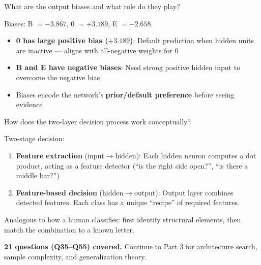 \documentclass[11pt,a4paper]{article}
\newcounter{qcounter}
\newcommand{\vq}[1]{\stepcounter{qcounter}\begin{tcolorbox}[qbox, title=Q\theqcounter]#1\end{tcolorbox}}
\newcommand{\va}[1]{\begin{tcolorbox}[abox, title=Answer]#1\end{tcolorbox}\vspace{6pt}}
\begin{document}
\vq{What are the output biases and what role do they play?}
\va{Biases: B $= -3.867$, 0 $= +3.189$, E $= -2.658$.
\begin{itemize}[nosep]
    \item \textbf{0 has large positive bias ($+3.189$)}: Default prediction when hidden units are inactive — aligns with all-negative weights for 0
    \item \textbf{B and E have negative biases}: Need strong positive hidden input to overcome the negative bias
    \item Biases encode the network's \textbf{prior/default preference} before seeing evidence
\end{itemize}
}

\vq{How does the two-layer decision process work conceptually?}
\va{Two-stage decision:
\begin{enumerate}[nosep]
    \item \textbf{Feature extraction} (input$\to$hidden): Each hidden neuron computes a dot product, acting as a feature detector (``is the right side open?'', ``is there a middle bar?'')
    \item \textbf{Feature-based decision} (hidden$\to$output): Output layer combines detected features. Each class has a unique ``recipe'' of required features.
\end{enumerate}
Analogous to how a human classifies: first identify structural elements, then match the combination to a known letter.
}

\begin{tcolorbox}[tipbox, title=\textbf{End of Part 2}]
\textbf{21 questions (Q35--Q55) covered.} Continue to Part 3 for architecture search, sample complexity, and generalization theory.
\end{tcolorbox}
\end{document}

